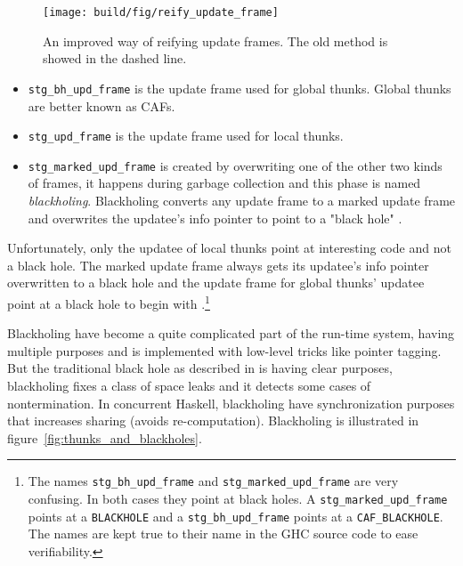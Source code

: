 \begin{figure}
\begin{mdframed}
  \texttt{[image: build/fig/reify\_update\_frame]}
  \caption{An improved way of reifying update frames. The old method is showed
    in the dashed line.}
  \label{fig:reify_update_frame}
\end{mdframed}
\end{figure}

\begin{itemize}
  \item
    \texttt{stg\_bh\_upd\_frame} is the update frame used for global
      thunks. Global thunks are better known as CAFs.
  \item
    \texttt{stg\_upd\_frame} is the update frame used for local
  thunks.
  \item
     \texttt{stg\_marked\_upd\_frame} is created
  by overwriting one of the other two kinds of frames, it
  happens during garbage collection and this phase is named
  \emph{blackholing}. Blackholing converts any update frame to a
  marked update frame \cite{github_overwrite_update_frame} and
  overwrites the updatee's info pointer to point to a "black hole"
  \cite{github_overwrite_blackhole}.
\end{itemize}

Unfortunately, only the updatee of local thunks point
at interesting code and not a black hole. The marked update frame
always gets its updatee's info pointer overwritten to a black
hole \cite{github_overwrite_blackhole} and the update frame
for global thunks' updatee point at a black hole to begin with
\cite{github_set_hdr_caf_blackhole}.\footnote{The names
  \texttt{stg\_bh\_upd\_frame} and \texttt{stg\_marked\_upd\_frame} are very
  confusing. In both cases they point at black holes. A
  \texttt{stg\_marked\_upd\_frame} points at a \texttt{BLACKHOLE} and a
  \texttt{stg\_bh\_upd\_frame} points at a \texttt{CAF\_BLACKHOLE}. The names
  are kept true to their name in the GHC source code to ease verifiability.}


Blackholing have become a quite complicated part of the run-time system,
having multiple purposes \cite{ghc_new_implementation_black_holes}
and is implemented with low-level tricks like pointer tagging. But the
traditional black hole as described in \cite{jones1992tail} is having
clear purposes, blackholing fixes a class of space leaks and it detects
some cases of nontermination. In concurrent Haskell, blackholing have
synchronization purposes that increases sharing (avoids re-computation). Blackholing
is illustrated in figure~\ref{fig:thunks_and_blackholes}.


